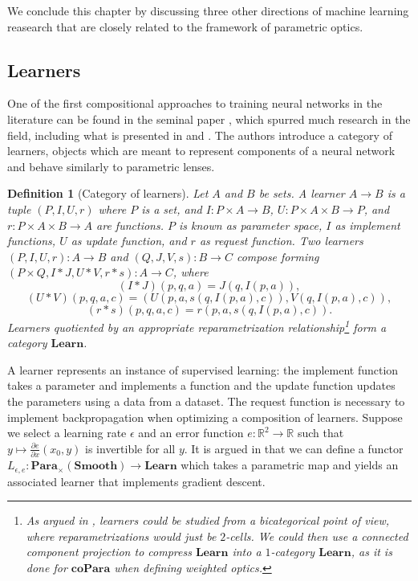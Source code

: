\documentclass[11pt,a4paper,openright,twoside]{report}
\theoremstyle{plain}
\newtheorem{definition}[proposition]{Definition}
\theoremstyle{definition}
\begin{document}
We conclude this chapter by discussing three other directions of machine learning reasearch that are closely related to the framework of parametric optics.
  

\subsection{Learners}


One of the first compositional approaches to training neural networks in the literature can be found in the seminal paper \cite{fong2019backprop}, which spurred much research in the field, including what is presented in \cite{gavranovic2024fundamental} and \cite{cruttwell2022categorical}. The authors introduce a category of learners, objects which are meant to represent components of a neural network and behave similarly to parametric lenses. 


\begin{definition}[Category of learners]
  Let $A$ and $B$ be sets. A learner $A \to B$ is a tuple $(P, I, U, r)$ where $P$ is a set, and $I: P \times A \to B$, $U: P \times A \times B \to P$, and $r: P \times A \times B \to A$ are functions.
  $P$ is known as parameter space, $I$ as implement functions, $U$ as update function, and $r$ as request function. Two learners $(P, I, U, r): A \to B$ and $(Q, J, V, s): B \to C$ compose forming $(P \times Q, I \ast J, U \ast V, r \ast s ): A \to C$, where
  \[(I \ast J)(p,q,a) = J(q,I(p,a)),\]
  \[(U \ast V)(p,q,a,c) = (U(p,a,s(q,I(p,a),c)), V(q,I(p,a),c)),\]
  \[(r \ast s)(p,q,a,c) = r(p,a,s(q,I(p,a),c)).\]
  Learners quotiented by an appropriate reparametrization relationship\footnote{As argued in \cite{fong2019backprop}, learners could be studied from a bicategorical point of view, where reparametrizations would just be $2$-cells. We could then use a connected component projection to compress $\mathbf{Learn}$ into a $1$-category $\mathbf{Learn}$, as it is done for $\mathbf{coPara}$ when defining weighted optics.} form a category $\mathbf{Learn}$.
\end{definition}

A learner represents an instance of supervised learning: the implement function takes a parameter and implements a function and the update function updates the parameters using a data from a dataset. The request function is necessary to implement backpropagation when optimizing a composition of learners. Suppose we select a learning rate $\epsilon$ and an error function $e: \mathbb{R}^2 \to \mathbb{R}$ such that $y \mapsto \frac{\partial e }{\partial x}(x_0, y)$ is invertible for all $y$. It is argued in \cite{fong2019backprop} that we can define a functor $L_{\epsilon, e}: \mathbf{Para}_{\times}(\mathbf{Smooth}) \to \mathbf{Learn}$ which takes a parametric map and yields an associated learner that implements gradient descent. 
\end{document}
